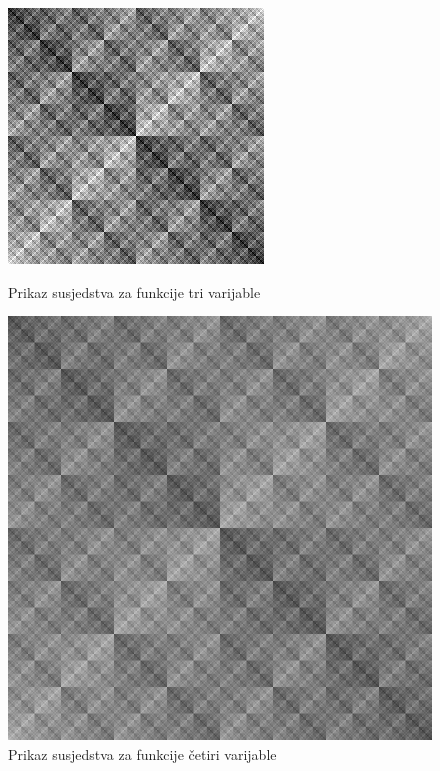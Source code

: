 \begin{figure}[!ht]
    \centering
    \begin{minipage}{.5\textwidth}
        \centering
        \includegraphics[width=.95\textwidth]{img/function_3}
        \captionsetup{justification=centering}
        \caption{Prikaz susjedstva za funkcije tri varijable}
        \label{fig:function_3}
    \end{minipage}%
    \begin{minipage}{.5\textwidth}
        \centering
        \includegraphics[width=.95\textwidth]{img/function_4}
        \captionsetup{justification=centering}
        \caption{Prikaz susjedstva za funkcije četiri varijable}
        \label{fig:function_4}
    \end{minipage}
\end{figure}

